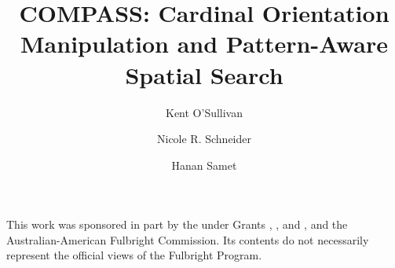 \documentclass[sigconf]{style/acmart}
\begin{document}
\graphicspath{ {figures/}{auto_commit_fig/}{auto_fig/} }

\newcommand{\latexfile}[1]{}

\newcommand\blankpage{    \null
    \thispagestyle{empty}    \addtocounter{page}{-1}    \newpage}



\title{COMPASS: Cardinal Orientation Manipulation and Pattern-Aware Spatial Search\\}

\author{Kent O'Sullivan}

\author{Nicole R. Schneider}
\authornotemark[1]

\author{Hanan Samet}



\begin{abstract}
\latexfile{00_Abstract.tex}
\end{abstract}

\maketitle


\latexfile{10_Introduction.tex}
\latexfile{20_Background.tex}
\latexfile{30_Data_Structures.tex}
\latexfile{40_Algorithms.tex}
\latexfile{50_Experimental_Setup.tex}
\latexfile{60_Results.tex}
\latexfile{70_Related.tex}
\latexfile{80_Conclusion.tex}


\begin{acks}
This work was sponsored in part by the  under Grants , , and , and the Australian-American Fulbright Commission. Its contents do not necessarily represent the official views of the Fulbright Program.
\end{acks}


 \label{bibliography}
\end{document}
